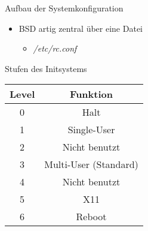 
\begin{slide}{Aufbau der Systemkonfiguration}
	\begin{itemize}
		\item{BSD artig zentral \"{u}ber eine Datei
			\begin{itemize}
				\item{\textit{/etc/rc.conf}
					
				}
			\end{itemize}
		}

	\end{itemize}
\end{slide}


\begin{slide}{Stufen des Initsystems}
	\begin{tabular}{|c|c|}
		\hline Level & Funktion\\
		\hline 0 & Halt\\
		\hline 1 & Single-User\\
		\hline 2 & Nicht benutzt\\
		\hline 3 & Multi-User (Standard)\\
		\hline 4 & Nicht benutzt\\
		\hline 5 & X11\\
		\hline 6 & Reboot\\
		\hline
	\end{tabular}
\end{slide}
